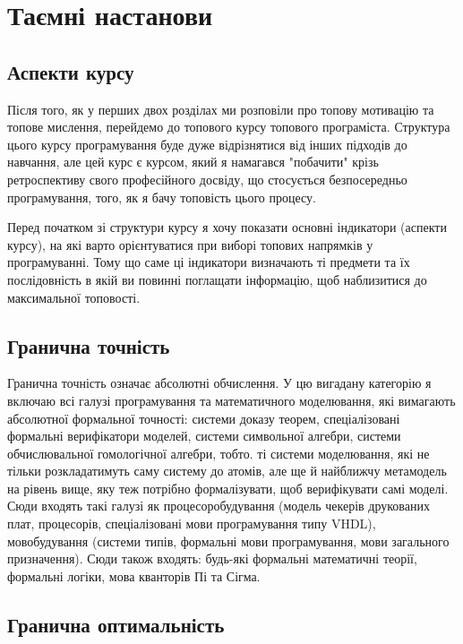 \section{Таємні настанови}

\subsection{Аспекти курсу}

Після того, як у перших двох розділах ми розповіли про
топову мотивацію та топове мислення, перейдемо до топового
курсу топового програміста. Структура цього курсу програмування
буде дуже відрізнятися від інших підходів до навчання, але цей
курс є курсом, який я намагався "побачити" крізь ретроспективу
свого професійного досвіду, що стосується безпосередньо
програмування, того, як я бачу топовість цього процесу.

Перед початком зі структури курсу я хочу показати основні
індикатори (аспекти курсу), на які варто орієнтуватися при
виборі топових напрямків у програмуванні. Тому що саме ці
індикатори визначають ті предмети та їх послідовність в
якій ви повинні поглащати інформацію, щоб наблизитися до
максимальної топовості.

\subsection{Гранична точність}

Гранична точність означає абсолютні обчислення. У цю вигадану
категорію я включаю всі галузі програмування та математичного
моделювання, які вимагають абсолютної формальної точності:
системи доказу теорем, спеціалізовані формальні верифікатори
моделей, системи символьної алгебри, системи обчислювальної
гомологічної алгебри, тобто. ті системи моделювання, які не
тільки розкладатимуть саму систему до атомів, але ще й найближчу
метамодель на рівень вище, яку теж потрібно формалізувати, щоб
верифікувати самі моделі. Сюди входять такі галузі як
процесоробудування (модель чекерів друкованих плат,
процесорів, спеціалізовані мови програмування типу VHDL),
мовобудування (системи типів, формальні мови програмування,
мови загального призначення). Сюди також входять: будь-які
формальні математичні теорії, формальні логіки, мова кванторів Пі та Сігма.

\subsection{Гранична оптимальність}

